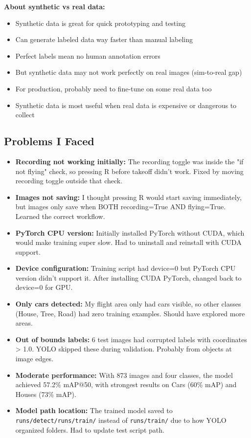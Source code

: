 \textbf{About synthetic vs real data:}
\begin{itemize}
	\item Synthetic data is great for quick prototyping and testing
	\item Can generate labeled data way faster than manual labeling
	\item Perfect labels mean no human annotation errors
	\item But synthetic data may not work perfectly on real images (sim-to-real gap)
	\item For production, probably need to fine-tune on some real data too
	\item Synthetic data is most useful when real data is expensive or dangerous to collect
\end{itemize}

\subsection{Problems I Faced}

\begin{itemize}
	\item \textbf{Recording not working initially:} The recording toggle was inside the "if not flying" check, so pressing R before takeoff didn't work. Fixed by moving recording toggle outside that check.
	
	\item \textbf{Images not saving:} I thought pressing R would start saving immediately, but images only save when BOTH recording=True AND flying=True. Learned the correct workflow.
	
	\item \textbf{PyTorch CPU version:} Initially installed PyTorch without CUDA, which would make training super slow. Had to uninstall and reinstall with CUDA support.
	
	\item \textbf{Device configuration:} Training script had device=0 but PyTorch CPU version didn't support it. After installing CUDA PyTorch, changed back to device=0 for GPU.
	
	\item \textbf{Only cars detected:} My flight area only had cars visible, so other classes (House, Tree, Road) had zero training examples. Should have explored more areas.
	
	\item \textbf{Out of bounds labels:} 6 test images had corrupted labels with coordinates > 1.0. YOLO skipped these during validation. Probably from objects at image edges.
	
	\item \textbf{Moderate performance:} With 873 images and four classes, the model achieved 57.2\% mAP@50, with strongest results on Cars (60\% mAP) and Houses (73\% mAP).
	
	\item \textbf{Model path location:} The trained model saved to \texttt{runs/detect/runs/train/} instead of \texttt{runs/train/} due to how YOLO organized folders. Had to update test script path.
\end{itemize}


